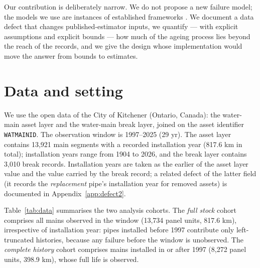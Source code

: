 \documentclass[review,12pt,authoryear]{elsarticle}
\begin{document}
Our contribution is deliberately narrow. We do not propose a new failure
model; the models we use are instances of established frameworks
\citep{LeGat2013,Scheidegger2013}. We document a data defect that changes
published-estimator inputs, we quantify --- with explicit assumptions and
explicit bounds --- how much of the ageing process lies beyond the reach of
the records, and we give the design whose implementation would move the
answer from bounds to estimates.

\section{Data and setting}
\label{sec:data}

We use the open data of the City of Kitchener (Ontario, Canada): the
water-main asset layer and the water-main break layer, joined on the asset
identifier \texttt{WATMAINID}. The observation window is 1997--2025
(29 yr). The asset layer contains 13,921 main segments with a
recorded installation year (817.6 km in total); installation years range
from 1904 to 2026, and the break layer contains 3,010 break
records. Installation years are taken as the earlier of the asset layer
value and the value carried by the break record; a related defect of the
latter field (it records the \emph{replacement} pipe's installation year for
removed assets) is documented in Appendix~\ref{app:defect2}.

Table~\ref{tab:data} summarises the two analysis cohorts. The \emph{full
stock} cohort comprises all mains observed in the window
(13,734 panel units, 817.6 km), irrespective of installation
year: pipes installed before 1997 contribute only left-truncated histories,
because any failure before the window is unobserved. The \emph{complete
history} cohort comprises mains installed in or after 1997
(8,272 panel units, 398.9 km), whose full life is observed.
\end{document}
